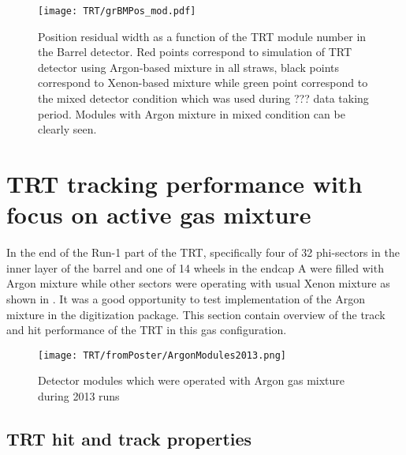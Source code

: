 \begin{figure}
\begin{center}
 \texttt{[image: TRT/grBMPos\_mod.pdf]}
\caption{ Position residual width as a function of the TRT module number in the Barrel detector. Red points correspond to simulation of TRT detector
using Argon-based mixture in all straws, black points correspond to Xenon-based mixture while green point correspond to the mixed detector condition
which was used during ??? data taking period. Modules with Argon mixture in mixed condition can be clearly seen.}
\label{fig:meanFreePath}
\end{center}
\end{figure}




\section{TRT tracking performance with focus on active gas mixture}
\label{sec:digi_argon}

In the end of the Run-1 part of the TRT, specifically
four of 32 phi-sectors in the inner layer of the barrel and one of 14 wheels in the endcap A were filled with Argon mixture while other sectors were operating 
with usual Xenon mixture as shown in .
It was a good opportunity to test implementation of the Argon mixture in the digitization package.
This section contain overview of the track and hit performance of the TRT in this gas configuration.

\begin{figure}
\begin{center}
 \texttt{[image: TRT/fromPoster/ArgonModules2013.png]}
\caption{Detector modules which were operated with Argon gas mixture during 2013 runs}
\label{fig:argonModulesIn2013}
\end{center}
\end{figure}

\subsection{TRT hit and track properties}


